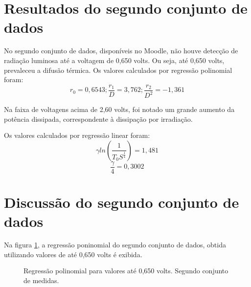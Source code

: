 \documentclass[brazilian,12pt,a4paper,final]{article}
\begin{document}
\section{Resultados do segundo conjunto de dados}

No segundo conjunto de dados, disponíveis no Moodle, 
não houve detecção de radiação luminosa até a voltagem de 0,650 volts.
Ou seja, até 0,650 volts, prevaleceu a difusão térmica.
Os valores calculados por regressão polinomial foram:
$$r_0=0,6543; \frac{r_1}{D}=3,762; \frac{r_2}{D^2}=-1,361$$

Na faixa de voltagens acima de 2,60 volts, foi notado um grande aumento da
potência dissipada, correspondente à dissipação por irradiação.

Os valores calculados por regressão linear foram:
$$\gamma ln(\frac{1}{T_0S^\frac{1}{4}}) = 1,481$$
$$\frac{\gamma}{4}=0,3002$$

\section{Discussão do segundo conjunto de dados}

Na figura \ref{figiniciopeq2}, a regressão poninomial do segundo conjunto
de dados, obtida utilizando 
valores de até 0,650 volts é exibida.

\begin{figure}[htbp!]
  \caption{Regressão polinomial para valores até 0,650 volts. Segundo conjunto de medidas.}
  \label{figiniciopeq2}
  \centering
\end{figure}
\end{document}
